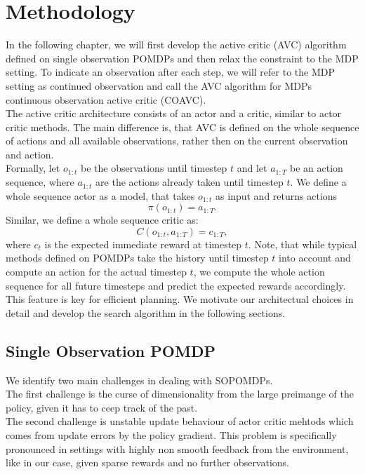 
\chapter{Methodology}
\label{chapter:Methodology}
In the following chapter, we will first develop the active critic (AVC) algorithm defined on single observation POMDPs and then relax 
the constraint to the MDP setting. To indicate an observation after each step, we will refer to the MDP setting as continued observation 
and call the AVC algorithm for MDPs continuous observation active critic (COAVC).\\

The active critic architecture consists of an actor and a critic, similar to actor critic methods. The main difference is, that AVC is defined on the whole sequence of 
actions and all available observations, rather then on the current observation and action.\\ 

Formally, let $o_{1:t}$ be the observations until timestep $t$ and let $a_{1:T}$ be an action sequence, where $a_{1:t}$ are the actions already taken until timestep $t$. 
We define a whole sequence actor as a model, that takes $o_{1:t}$ as input and returns actions 
\begin{equation}
    \label{eq:def_wsa}
    \pi(o_{1:t}) = a_{1:T}.
\end{equation}
Similar, we define a whole sequence critic as: 
\begin{equation}
    \label{eq:def_wsc}
    C(o_{1:t}, a_{1:T}) = c_{1:T},
\end{equation}
where $c_t$ is the expected immediate reward at timestep $t$. Note, that while typical methods defined on POMDPs take the history until 
timestep $t$ into account and compute an action for the actual timestep $t$, we compute the whole action sequence for all future timesteps and predict the expected rewards 
accordingly. This feature is key for efficient planning. We motivate our architectual choices in detail and develop the search algorithm in the following sections.


\section{Single Observation POMDP}
We identify two main challenges in dealing with SOPOMDPs. \\
The first challenge is the curse of dimensionality from the large preimange of the policy, given it has to ceep track 
of the past. \\
The second challenge is unstable update behaviour of actor critic mehtods which comes from update errors by the policy gradient. This problem 
is specifically pronounced in settings with highly non smooth feedback from the environment, like in our case, given sparse rewards 
and no further observations.

